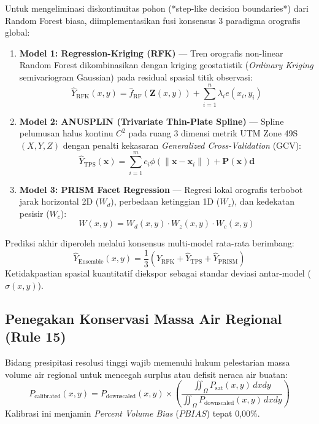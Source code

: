 \documentclass[11pt,a4paper]{article}
\begin{document}
Untuk mengeliminasi diskontinuitas pohon (*step-like decision boundaries*) dari Random Forest biasa, diimplementasikan fusi konsensus 3 paradigma orografis global:
\begin{enumerate}
    \item \textbf{Model 1: Regression-Kriging (RFK)} --- Tren orografis non-linear Random Forest dikombinasikan dengan kriging geostatistik (\textit{Ordinary Kriging} semivariogram Gaussian) pada residual spasial titik observasi:
    \begin{equation}
        \hat{Y}_{\text{RFK}}(x, y) = \hat{f}_{\text{RF}}(\mathbf{Z}(x, y)) + \sum_{i=1}^n \lambda_i e(x_i, y_i)
    \end{equation}
    \item \textbf{Model 2: ANUSPLIN (Trivariate Thin-Plate Spline)} --- Spline pelumusan halus kontinu $C^2$ pada ruang 3 dimensi metrik UTM Zone 49S $(X, Y, Z)$ dengan penalti kekasaran \textit{Generalized Cross-Validation} (GCV):
    \begin{equation}
        \hat{Y}_{\text{TPS}}(\mathbf{x}) = \sum_{i=1}^m c_i \phi(\|\mathbf{x} - \mathbf{x}_i\|) + \mathbf{P}(\mathbf{x})\mathbf{d}
    \end{equation}
    \item \textbf{Model 3: PRISM Facet Regression} --- Regresi lokal orografis terbobot jarak horizontal 2D ($W_d$), perbedaan ketinggian 1D ($W_z$), dan kedekatan pesisir ($W_c$):
    \begin{equation}
        W(x, y) = W_d(x, y) \cdot W_z(x, y) \cdot W_c(x, y)
    \end{equation}
\end{enumerate}
Prediksi akhir diperoleh melalui konsensus multi-model rata-rata berimbang:
\begin{equation}
    \hat{Y}_{\text{Ensemble}}(x, y) = \frac{1}{3} \left( \hat{Y}_{\text{RFK}} + \hat{Y}_{\text{TPS}} + \hat{Y}_{\text{PRISM}} \right)
\end{equation}
Ketidakpastian spasial kuantitatif diekspor sebagai standar deviasi antar-model ($\sigma(x, y)$).

\subsection{Penegakan Konservasi Massa Air Regional (Rule 15)}
Bidang presipitasi resolusi tinggi wajib memenuhi hukum pelestarian massa volume air regional untuk mencegah surplus atau defisit neraca air buatan:
\begin{equation}
    P_{\text{calibrated}}(x, y) = P_{\text{downscaled}}(x, y) \times \left( \frac{\iint_{\Omega} P_{\text{sat}}(x, y) \, dx dy}{\iint_{\Omega} P_{\text{downscaled}}(x, y) \, dx dy} \right)
\end{equation}
Kalibrasi ini menjamin \textit{Percent Volume Bias} ($PBIAS$) tepat 0,00\%.
\end{document}
